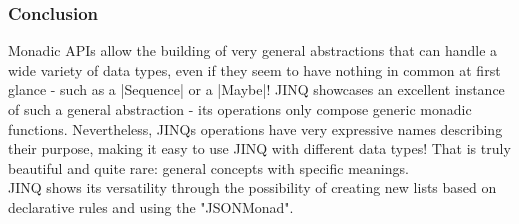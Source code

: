 \subsubsection{Conclusion} %
\label{sec:Conclusion}
Monadic APIs allow the building of very general abstractions that can handle a
wide variety of data types, even if they seem to have nothing in common at
first glance - such as a |Sequence| or a |Maybe|! JINQ showcases an excellent
instance of such a general abstraction - its operations only compose generic
monadic functions. Nevertheless, JINQs operations have very expressive names
describing their purpose, making it easy to use JINQ with different data types!
That is truly beautiful and quite rare: general concepts with specific
meanings.\\ 
JINQ shows its versatility through the possibility of creating new lists based
on declarative rules and using the "JSONMonad".

